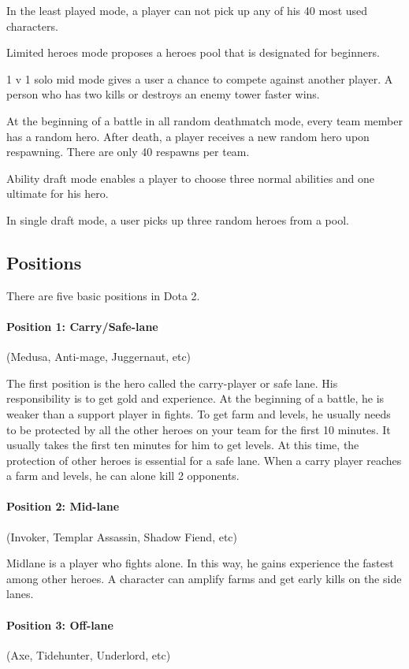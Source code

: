 \documentclass[10pt,twoside,slovak,a4paper]{article}
\begin{document}
In the least played mode, a player can not pick up any of his 40 most used characters.

Limited heroes mode proposes a heroes pool that is designated for beginners.

1 v 1 solo mid mode gives a user a chance to compete against another player. A person who has two kills or destroys an enemy tower faster wins.

At the beginning of a battle in all random deathmatch mode, every team member has a random hero. After death, a player receives a new random hero upon respawning. There are only 40 respawns per team. 

Ability draft mode enables a player to choose three normal abilities and one ultimate for his hero.

In single draft mode, a user picks up three random heroes from a pool.

\subsection{Positions} \label{positions}
There are five basic positions in Dota 2.\cite{ Balaji:Dota}
\paragraph{Position 1: Carry/Safe-lane} (Medusa, Anti-mage, Juggernaut, etc)

The first position is the hero called the carry-player or safe lane. His responsibility is to get gold and experience. At the beginning of a battle, he is weaker than a support player in fights. To get farm and levels, he usually needs to be protected by all the other heroes on your team for the first 10 minutes. It usually takes the first ten minutes for him to get levels. At this time, the protection of other heroes is essential for a safe lane. When a carry player reaches a farm and levels, he can alone kill 2 opponents.
\paragraph{Position 2: Mid-lane} (Invoker, Templar Assassin, Shadow Fiend, etc)

Midlane is a player who fights alone. In this way, he gains experience the fastest among other heroes. A character can amplify farms and get early kills on the side lanes.
\paragraph{Position 3: Off-lane} (Axe, Tidehunter, Underlord, etc)
\end{document}
